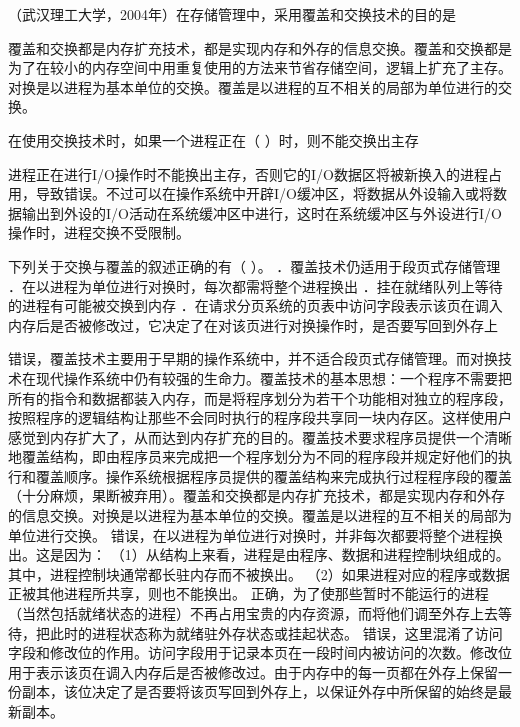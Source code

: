 \question （武汉理工大学，2004年）在存储管理中，采用覆盖和交换技术的目的是
\par{}
\begin{solution}覆盖和交换都是内存扩充技术，都是实现内存和外存的信息交换。覆盖和交换都是为了在较小的内存空间中用重复使用的方法来节省存储空间，逻辑上扩充了主存。对换是以进程为基本单位的交换。覆盖是以进程的互不相关的局部为单位进行的交换。
\end{solution}
\question 在使用交换技术时，如果一个进程正在（ ）时，则不能交换出主存
\par{}
\begin{solution}进程正在进行I/O操作时不能换出主存，否则它的I/O数据区将被新换入的进程占用，导致错误。不过可以在操作系统中开辟I/O缓冲区，将数据从外设输入或将数据输出到外设的I/O活动在系统缓冲区中进行，这时在系统缓冲区与外设进行I/O操作时，进程交换不受限制。
\end{solution}
\question 下列关于交换与覆盖的叙述正确的有（ ）。
．覆盖技术仍适用于段页式存储管理
．在以进程为单位进行对换时，每次都需将整个进程换出
．挂在就绪队列上等待的进程有可能被交换到内存
．在请求分页系统的页表中访问字段表示该页在调入内存后是否被修改过，它决定了在对该页进行对换操作时，是否要写回到外存上
\par{}
\begin{solution}错误，覆盖技术主要用于早期的操作系统中，并不适合段页式存储管理。而对换技术在现代操作系统中仍有较强的生命力。覆盖技术的基本思想：一个程序不需要把所有的指令和数据都装入内存，而是将程序划分为若干个功能相对独立的程序段，按照程序的逻辑结构让那些不会同时执行的程序段共享同一块内存区。这样使用户感觉到内存扩大了，从而达到内存扩充的目的。覆盖技术要求程序员提供一个清晰地覆盖结构，即由程序员来完成把一个程序划分为不同的程序段并规定好他们的执行和覆盖顺序。操作系统根据程序员提供的覆盖结构来完成执行过程程序段的覆盖（十分麻烦，果断被弃用）。覆盖和交换都是内存扩充技术，都是实现内存和外存的信息交换。对换是以进程为基本单位的交换。覆盖是以进程的互不相关的局部为单位进行交换。
错误，在以进程为单位进行对换时，并非每次都要将整个进程换出。这是因为：
（1）从结构上来看，进程是由程序、数据和进程控制块组成的。其中，进程控制块通常都长驻内存而不被换出。
（2）如果进程对应的程序或数据正被其他进程所共享，则也不能换出。
正确，为了使那些暂时不能运行的进程（当然包括就绪状态的进程）不再占用宝贵的内存资源，而将他们调至外存上去等待，把此时的进程状态称为就绪驻外存状态或挂起状态。
错误，这里混淆了访问字段和修改位的作用。访问字段用于记录本页在一段时间内被访问的次数。修改位用于表示该页在调入内存后是否被修改过。由于内存中的每一页都在外存上保留一份副本，该位决定了是否要将该页写回到外存上，以保证外存中所保留的始终是最新副本。
\end{solution}
